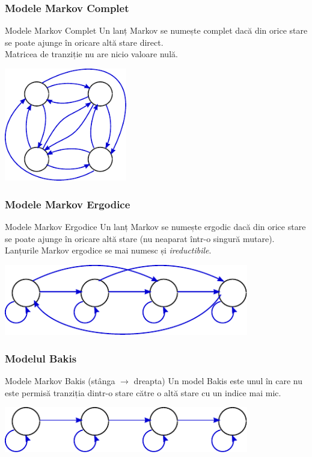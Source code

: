 \begin{frame}
  \frametitle{Modele Markov Complet}
  \begin{block}{Modele Markov Complet}
    Un lanț Markov se numește \alert{complet} dacă din orice stare se poate ajunge în oricare altă stare direct.\\
    Matricea de tranziție nu are nicio valoare nulă.
  \end{block}
  \vspace*{1em}
  \begin{center}
    \includegraphics[width=0.4\textwidth]{graphics/other-hmm/full.pdf}
  \end{center}
\end{frame}


\begin{frame}
  \frametitle{Modele Markov Ergodice}
  \begin{block}{Modele Markov Ergodice}
    Un lanț Markov se numește \alert{ergodic} dacă din orice stare se poate ajunge în oricare altă stare (nu neaparat într-o singură mutare).\\
    Lanțurile Markov ergodice se mai numesc și \emph{ireductibile}.
  \end{block}
  \vspace*{1em}
  \begin{center}
    \includegraphics[width=0.8\textwidth]{graphics/other-hmm/ergodic.pdf}
  \end{center}
\end{frame}

\begin{frame}
  \frametitle{Modelul Bakis}
  \begin{block}{Modele Markov Bakis (stânga $\longrightarrow$ dreapta)}
    Un model \alert{Bakis} este unul în care nu este permisă tranziția
    dintr-o stare către o altă stare cu un indice mai mic.
  \end{block}
  \vspace*{1em}
  \begin{center}
    \includegraphics[width=0.8\textwidth]{graphics/other-hmm/left-to-right.pdf}
  \end{center}
\end{frame}

